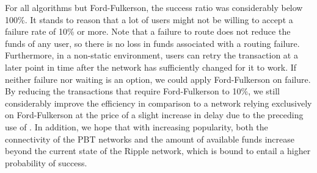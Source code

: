 For all algorithms but Ford-Fulkerson, the success ratio was considerably below 100\%. It stands to reason that a lot of users might not be willing to accept a failure rate of 10\% or more. Note that a failure to route does not reduce the funds of any user, so there is no loss in funds associated with a routing failure.  
Furthermore, in a non-static environment, users can retry the transaction at a later point in time after the network has sufficiently changed for it to work.  
If neither failure nor waiting is an option, we could apply Ford-Fulkerson on failure. By reducing the transactions that require Ford-Fulkerson to 10\%, we still considerably improve the efficiency in comparison to a network relying exclusively on Ford-Fulkerson at the price of a slight increase in delay due to the preceding use of \oursys. 
In addition, we hope that with increasing popularity, both the connectivity of the PBT networks and the amount of available funds increase beyond the current state of the Ripple network, which is bound to entail a higher probability of success.

